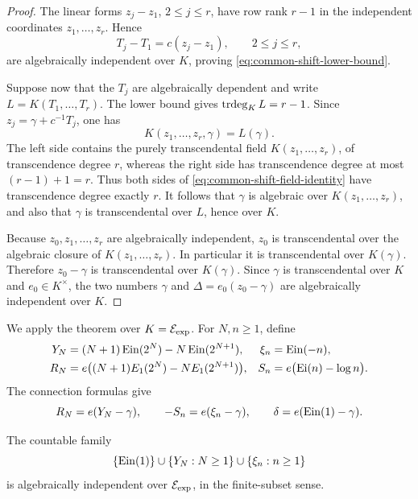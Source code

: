 \begin{proof}
The linear forms \(z_j-z_1\), \(2\leq j\leq r\), have row rank \(r-1\)
in the independent coordinates \(z_1,\ldots,z_r\).  Hence
\[
 T_j-T_1=c(z_j-z_1),\qquad 2\leq j\leq r,
\]
are algebraically independent over \(K\), proving
\eqref{eq:common-shift-lower-bound}.

Suppose now that the \(T_j\) are algebraically dependent and write
\(L=K(T_1,\ldots,T_r)\).  The lower bound gives
\(\operatorname{trdeg}_K L=r-1\).  Since \(z_j=\gamma+c^{-1}T_j\), one has
\begin{equation}\label{eq:common-shift-field-identity}
 K(z_1,\ldots,z_r,\gamma)=L(\gamma).
\end{equation}
The left side contains the purely transcendental field
\(K(z_1,\ldots,z_r)\), of transcendence degree \(r\), whereas the right
side has transcendence degree at most \((r-1)+1=r\).  Thus both sides of
\eqref{eq:common-shift-field-identity} have transcendence degree exactly
\(r\).  It follows that \(\gamma\) is algebraic over
\(K(z_1,\ldots,z_r)\), and also that \(\gamma\) is transcendental over
\(L\), hence over \(K\).

Because \(z_0,z_1,\ldots,z_r\) are algebraically independent, \(z_0\) is
transcendental over the algebraic closure of
\(K(z_1,\ldots,z_r)\).  In particular it is transcendental over
\(K(\gamma)\).  Therefore \(z_0-\gamma\) is transcendental over
\(K(\gamma)\).  Since \(\gamma\) is transcendental over \(K\) and
\(e_0\in K^\times\), the two numbers
\(\gamma\) and \(\Delta=e_0(z_0-\gamma)\) are algebraically independent
over \(K\).
\end{proof}

We apply the theorem over \(K=\mathcal E_{\mathrm{exp}}\).  For \(N,n\geq1\), define
\begin{align}
 Y_N&=(N+1)\operatorname{Ein}(2^N)-N\operatorname{Ein}(2^{N+1}),
 &\xi_n&=\operatorname{Ein}(-n),\label{eq:residual-Ein-coordinates}\\
 R_N&=e\bigl((N+1)E_1(2^N)-N E_1(2^{N+1})\bigr),
 &S_n&=e\bigl(\operatorname{Ei}(n)-\log n\bigr).
 \label{eq:residual-classical-coordinates}
\end{align}
The connection formulas give
\begin{equation}\label{eq:residual-common-shift}
 R_N=e(Y_N-\gamma),
 \qquad
 -S_n=e(\xi_n-\gamma),
 \qquad
 \delta=e(\operatorname{Ein}(1)-\gamma).
\end{equation}

\begin{lemma}
\label{lem:residual-Ein-independent}
The countable family
\[
 \{\operatorname{Ein}(1)\}\cup\{Y_N:N\geq1\}\cup\{\xi_n:n\geq1\}
\]
is algebraically independent over \(\mathcal E_{\mathrm{exp}}\), in the finite-subset sense.
\end{lemma}

